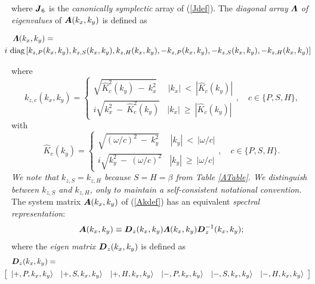 where ${\mbox{\boldmath$\mit J$\unboldmath}}_6$ is the {\em canonically symplectic\/} array of 
(\ref{Jdef}).
The {\em diagonal array\/} ${\mbox{\boldmath$\mit \Lambda$\unboldmath}}$ {\em of eigenvalues\/}  of ${\mbox{\boldmath$\mit A$\unboldmath}}({k}_{x},{k}_{y})$ is defined as
\begin{samepage}\begin{eqnarray}	\label{eigDef}
\lefteqn{	{\bmi \Lambda}({k}_{x},{k}_{y}) =}\\
&&\!\!\!\!\!\!\!\!\!\!\!\!
i \ \mbox{diag} \left[{k}_{z,P 
	}({k}_{x},{k}_{y}),{k}_{z,S }({k}_{x},{k}_{y}),{k}_{z,H }({k}_{x},{k}_{y}),
	-{k}_{z,P }({k}_{x},{k}_{y}),-{k}_{z,S }({k}_{x},{k}_{y}),
	-{k}_{z,H }({k}_{x},{k}_{y}) \right] \nonumber
\end{eqnarray}\end{samepage}
where
\begin{equation}	\label{kzcDef}
	{k}_{z,c}({k}_{x},{k}_{y}) = \left\{
	\begin{array}{c}
	\sqrt {\hat{ K}_{c}^{2}({k}_{y})\ -\ {k}_{x}^{2}}\ \ \ \ \ \ |{k}_{x}|\ <\ 
	|\hat{K}_{c}({k}_{y})|\\
	i\sqrt {{k}_{x}^{ 2}\ -\ \hat{ K}_{c}^{2}({k}_{y})} \ \ \ \ |{k}_{x}|\ \ge   \ 
	|\hat{K}_{c}({k}_{y})|
\end{array}
\right. , \quad  c\in\{P,S,H\}, 
\end{equation}
with
\begin{equation}	\label{Kdef}
	\hat{K}_{c}({k}_{y}) = \left\{
	\begin{array}{c}
	\sqrt {(\omega/{c})^{2}\ -\ {k}_{y}^{2}}\ \ \ \ \ \ |{k}_{y}|\ <\ 
	|\omega/{c}|\\
	i\sqrt {{k}_{y}^{ 2}\ -\ (\omega/{c})^{2}} \ \ \ \ |{k}_{y}|\ \ge   \ |\omega/{c}|
\end{array} \right. , \quad  c\in\{P,S,H\}. 
\end{equation}
{\em We note that ${k}_{z,S }={k}_{z,H }$ 
because $S=H=\beta$ from Table \ref{ATable}. We distinguish 
between ${k}_{z,S }$ and ${k}_{z,H }$,  only to maintain a self-consistent 
notational convention.\/}
 The system matrix ${\mbox{\boldmath$\mit A$\unboldmath}}({k}_{x},{k}_{y})$ of (\ref{Akdef}) has an equivalent {\em 
spectral representation\/}:
\begin{equation}	\label{specA}
	{\mbox{\boldmath$\mit A$\unboldmath}}({k}_{x},{k}_{y}) \equiv {\mbox{\boldmath$\mit D$\unboldmath}}_{z}({k}_{x},{k}_{y}){\mbox{\boldmath$\mit \Lambda$\unboldmath} }({k}_{x},{k}_{y}){\mbox{\boldmath$\mit D$\unboldmath}}_{z}^{ -1}({k}_{x},{k}_{y});
\end{equation} 
where the {\em eigen matrix\/} ${\mbox{\boldmath$\mit D$\unboldmath}}_{z}({k}_{x},{k}_{y})$ is  defined as
\begin{eqnarray} \label{Ddef}
\lefteqn{{\bmi D}_{z}(k_{x},k_{y})=}\\
&&\!\!\!\!\!\!\!\!\!\!\!\!
\left[\begin{array}{cccccc}
\left|+,P, k_{x},k_{y}  \right\rangle&\left|+,S, k_{x},k_{y}  
\right\rangle&\left|+,H, k_{x},k_{y}  \right\rangle&
\left|-,P, k_{x},k_{y}  \right\rangle&\left|-,S, k_{x},k_{y}  
\right\rangle&\left|-,H, k_{x},k_{y}  \right\rangle
\end{array}\right]\nonumber
\end{eqnarray}
